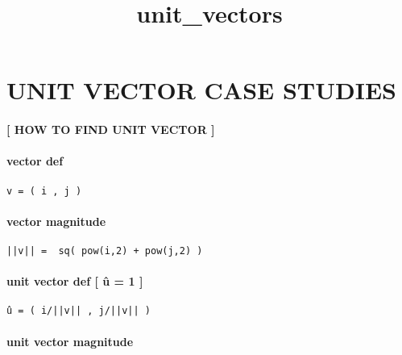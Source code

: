 \documentclass[11pt]{article}
\title{unit\_vectors}
\begin{document}
    
    \maketitle
    
    

    
    \hypertarget{unit-vector-case-studies}{%
\section{UNIT VECTOR CASE STUDIES}\label{unit-vector-case-studies}}

    \hypertarget{how-to-find-unit-vector}{%
\paragraph{{[} HOW TO FIND UNIT VECTOR
{]}}\label{how-to-find-unit-vector}}

\hypertarget{vector-def}{%
\paragraph{vector def}\label{vector-def}}

\begin{verbatim}
v = ( i , j )
\end{verbatim}

\hypertarget{vector-magnitude}{%
\paragraph{vector magnitude}\label{vector-magnitude}}

\begin{verbatim}
||v|| =  sq( pow(i,2) + pow(j,2) )
\end{verbatim}

\hypertarget{unit-vector-def-uxfb-1}{%
\paragraph{unit vector def {[} û = 1 {]}}\label{unit-vector-def-uxfb-1}}

\begin{verbatim}
û = ( i/||v|| , j/||v|| )
\end{verbatim}

\hypertarget{unit-vector-magnitude}{%
\paragraph{unit vector magnitude}\label{unit-vector-magnitude}}
\end{document}
